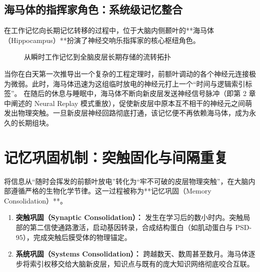 \documentclass[12pt,a4paper,openany]{ctexbook}
\begin{document}
\subsection*{海马体的指挥家角色：系统级记忆整合}

在工作记忆向长期记忆转移的过程中，位于大脑内侧颞叶的**海马体（Hippocampus）**扮演了神经交响乐指挥家的核心枢纽角色。

\begin{figure}[H]
\centering
{}
\caption{从瞬时工作记忆到全脑皮层长期存储的流转拓扑}
\end{figure}

当你在白天第一次推导出一个复杂的工程定理时，前额叶调动的各个神经元连接极为微弱。此时，海马体迅速为这组临时放电的神经元打上一个“时间与逻辑索引标签”。
在随后的休息与睡眠中，海马体不断向新皮层发送神经信号脉冲（即第 2 章中阐述的 Neural Replay 模式重放），促使新皮层中原本互不相干的神经元之间萌发出物理突触。一旦新皮层神经回路彻底打通，该记忆便不再依赖海马体，成为永久的长期组块。

\section{记忆巩固机制：突触固化与间隔重复}

将信息从“随时会挥发的前额叶放电”转化为“牢不可破的皮层物理突触”，在大脑内部遵循严格的生物化学节律。这一过程被称为**记忆巩固（Memory Consolidation）**。

\begin{keypoint}[记忆巩固的两个时间尺度]
\begin{enumerate}
    \item \textbf{突触巩固（Synaptic Consolidation）：} 发生在学习后的数小时内。突触局部的第二信使通路激活，启动基因转录，合成结构蛋白（如肌动蛋白与 PSD-95），完成突触后膜受体的物理锚定。
    \item \textbf{系统巩固（Systems Consolidation）：} 跨越数天、数周甚至数月。海马体逐步将索引权移交给大脑新皮层，知识点与既有的庞大知识网络彻底咬合互联。
\end{enumerate}
\end{keypoint}
\end{document}
